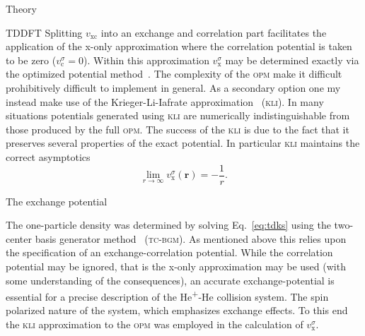 \documentclass[aps, pra, reprint, groupedaddress, amsfonts,
               amsmath, amssymb, showpacs, nofootinbib]{revtex4-1}
\begin{document}
\begin{section}{Theory \label{sec:theory}}
\begin{subsection}{TDDFT \label{sec:tddft}}
      Splitting $v_\mathrm{xc}$ into an exchange and correlation part facilitates the application of the
      x-only approximation where the correlation potential is taken to be zero ($v^\sigma_\mathrm{c} =
      0$). Within this approximation $v^\sigma_\mathrm{x}$ may be determined exactly via the optimized
      potential method~\cite{opm1, opm2, tdopm}. The complexity of the \textsc{opm} make it difficult
      prohibitively difficult to implement in general. As a secondary option one my instead make use of
      the Krieger-Li-Iafrate approximation~\cite{klieq, tdkli1, tdkli2} (\textsc{kli}). In many
      situations potentials generated using \textsc{kli} are numerically indistinguishable from those
      produced by the full \textsc{opm}. The success of the \textsc{kli} is due to the fact that it
      preserves several properties of the exact potential. In particular \textsc{kli} maintains the
      correct asymptotics
      \begin{equation} \label{eq:asymp}
         \lim\limits_{r \rightarrow \infty} v_\mathrm{x}^\sigma (\mathbf{r}) = -\frac{1}{r}.
      \end{equation}
   
   \end{subsection}

   \begin{subsection}{The exchange potential \label{sec:xpot}}

      The one-particle density was determined by solving Eq.~\eqref{eq:tdks} using the two-center basis
      generator method~\cite{tcbgm} (\textsc{tc-bgm}). As mentioned above this relies upon the
      specification of an exchange-correlation potential. While the correlation potential may be
      ignored, that is the x-only approximation may be used (with some understanding of the
      consequences), an accurate exchange-potential is essential for a precise description of the
      He\textsuperscript{+}-He collision system. The spin polarized nature of the system, which
      emphasizes exchange effects. To this end the \textsc{kli} approximation to the \textsc{opm} was
      employed in the calculation of $v^\sigma_\mathrm{x}$.


\end{subsection}
\end{section}
\end{document}
